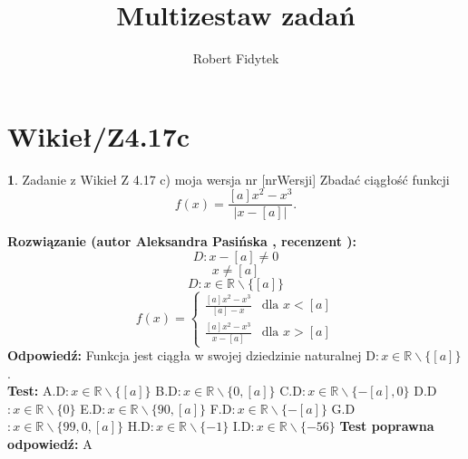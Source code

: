 \documentclass[12pt, a4paper]{article}
\title{Multizestaw zadań}
\author{Robert Fidytek}
\date{}
\theoremstyle{definition} %
\newtheorem{zad}{}
\newcommand{\kategoria}[1]{\section{#1}} %
\newcommand{\zadStart}[1]{\begin{zad}#1\newline} %
\newcommand{\zadStop}{\end{zad}}   %
\newcommand{\rozwStart}[2]{\noindent \textbf{Rozwiązanie (autor #1 , recenzent #2): }\newline} %
\newcommand{\rozwStop}{\newline}                                            %
\newcommand{\odpStart}{\noindent \textbf{Odpowiedź:}\newline}    %
\newcommand{\odpStop}{\newline}                                             %
\newcommand{\testStart}{\noindent \textbf{Test:}\newline} %
\newcommand{\testStop}{\newline} %
\newcommand{\kluczStart}{\noindent \textbf{Test poprawna odpowiedź:}\newline} %
\newcommand{\kluczStop}{\newline} %
\begin{document}
\maketitle


\kategoria{Wikieł/Z4.17c}
\zadStart{Zadanie z Wikieł Z 4.17 c) moja wersja nr [nrWersji]}
Zbadać ciągłość funkcji $$f(x)=\frac{[a]x^2-x^3}{|x-[a]|}.$$
\zadStop
\rozwStart{Aleksandra Pasińska}{}
$$D:x-[a]\neq 0$$
$$x\neq[a]$$
$$D:x\in \mathbb{R}\backslash \{[a]\}$$
$$f(x)= \left\{ \begin{array}{ll}
\frac{[a]x^2-x^3}{[a]-x} & \textrm{dla $x<[a]$}\\
\frac{[a]x^2-x^3}{x-[a]} & \textrm{dla $x>[a]$} 
\end{array} \right.$$
\rozwStop
\odpStart
Funkcja jest ciągła w swojej dziedzinie naturalnej D$:x\in \mathbb{R}\backslash \{[a]\}$.\\
\odpStop
\testStart
A.D$:x\in \mathbb{R}\backslash \{[a]\}$
B.D$:x\in \mathbb{R}\backslash \{0,[a]\}$
C.D$:x\in \mathbb{R}\backslash \{-[a],0\}$
D.D$:x\in \mathbb{R}\backslash \{0\}$
E.D$:x\in \mathbb{R}\backslash \{90,[a]\}$
F.D$:x\in \mathbb{R}\backslash \{-[a]\}$
G.D$:x\in \mathbb{R}\backslash \{99,0,[a]\}$
H.D$:x\in \mathbb{R}\backslash \{-1\}$
I.D$:x\in \mathbb{R}\backslash \{-56\}$
\testStop
\kluczStart
A
\kluczStop
\end{document}
